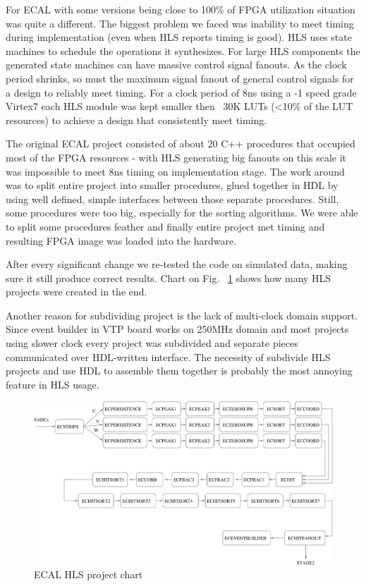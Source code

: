 For ECAL with some versions being close to 100\% of FPGA utilization situation was quite a different.
The biggest problem we faced was inability to meet timing during implementation (even when HLS reports timing is good). HLS uses state machines to schedule the operations it synthesizes. For large HLS components the generated state machines can have massive control signal fanouts. As the clock period shrinks, so must the maximum signal fanout of general control signals for a design to reliably meet timing. For a clock period of 8ns using a -1 speed grade Virtex7 each HLS module was kept smaller then ~30K LUTs (<10\% of the LUT resources) to achieve a design that consistently meet timing.

The original ECAL project consisted of about 20 C++ procedures that occupied most of the FPGA resources - with HLS generating big fanouts on this scale it was impossible to meet 8ns timing on implementation stage. The work around was to split entire project into smaller procedures, glued together in HDL by using well defined, simple interfaces between those separate procedures. Still, some procedures were too big, especially for the sorting algorithms. We were able to split some procedures feather and finally entire project met timing and resulting FPGA image was loaded into the hardware.

After every significant change we re-tested the code on simulated data, making sure it still produce correct results. Chart on Fig. ~\ref{fig:hls_chart} shows how many HLS projects were created in the end.

Another reason for subdividing project is the lack of multi-clock domain support. Since event builder in VTP board works on 250MHz domain and most projects using slower clock every project was subdivided and separate pieces communicated over HDL-written interface. The necessity of subdivide HLS projects and use HDL to assemble them together is probably the most annoying feature in HLS usage.

\begin{figure}[hbt]
	\centering
	\includegraphics[width=1.0\columnwidth,keepaspectratio]{img/hls_chart.png}
	\caption{ECAL HLS project chart}
	\label{fig:hls_chart}
\end{figure}


